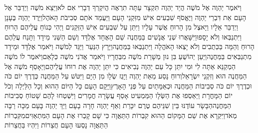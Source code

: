\documentclass[../main/main.tex]{subfiles}
\begin{document}
\begin{multicols}{\ncols}
וַיֹּאמֶר יַהְוֶה אֶל מֹשֶׁה הֲיַד יַהְוֶה תִּקְצָר עַתָּה תִרְאֶה הֲיִקְרְךָ דְבָרִי אִם לֹא\PreVerseSpace{}וַיֵּצֵא מֹשֶׁה וַיְדַבֵּר אֶל הָעָם אֵת דִּבְרֵי יַהְוֶה וַיֶּאֱסֹף שִׁבְעִים אִישׁ מִזִּקְנֵי הָעָם וַיַּעֲמֵד אֹתָם סְבִיבֹת הָאֹהֶל\PreVerseSpace{}וַיֵּרֶד יַהְוֶה בֶּעָנָן וַיְדַבֵּר אֵלָיו וַיָּאצֶל מִן הָרוּחַ אֲשֶׁר עָלָיו וַיִּתֵּן עַל שִׁבְעִים אִישׁ הַזְּקֵנִים וַיְהִי כְּנוֹחַ עֲלֵיהֶם הָרוּחַ וַיִּתְנַבְּאוּ וְלֹא יָסָפוּ\PreVerseSpace{}וַיִּשָּׁאֲרוּ שְׁנֵי אֲנָשִׁים בַּמַּחֲנֶה שֵׁם הָאֶחָד אֶלְדָּד וְשֵׁם הַשֵּׁנִי מֵידָד וַתָּנַח עֲלֵהֶם הָרוּחַ וְהֵמָּה בַּכְּתֻבִים וְלֹא יָצְאוּ הָאֹהֱלָה וַיִּתְנַבְּאוּ בַּמַּחֲנֶה\PreVerseSpace{}וַיָּרָץ הַנַּעַר וַיַּגֵּד לְמֹשֶׁה וַיֹּאמַר אֶלְדָּד וּמֵידָד מִתְנַבְּאִים בַּמַּחֲנֶה\PreVerseSpace{}וַיַּעַן יְהוֹשֻׁעַ בִּן נוּן מְשָׁרֵת מֹשֶׁה מִבְּחֻרָיו וַיֹּאמַר אֲדֹנִי מֹשֶׁה כְּלָאֵם\PreVerseSpace{}וַיֹּאמֶר לוֹ מֹשֶׁה הַמְקַנֵּא אַתָּה לִי וּמִי יִתֵּן כָּל עַם יַהְוֶה נְבִיאִים כִּי יִתֵּן יַהְוֶה אֶת רוּחוֹ עֲלֵיהֶם\PreVerseSpace{}וַיֵּאָסֵף מֹשֶׁה אֶל הַמַּחֲנֶה הוּא וְזִקְנֵי יִשְׂרָאֵל\PreVerseSpace{}וְרוּחַ נָסַע מֵאֵת יַהְוֶה וַיָּגֶז\SubEnd{} שְׂלָו\SubEnd{} מִן הַיָּם וַיִּטֹּשׁ עַל הַמַּחֲנֶה כְּדֶרֶךְ יוֹם כֹּה וּכְדֶרֶךְ יוֹם כֹּה סְבִיבוֹת הַמַּחֲנֶה וּכְאַמָּתַיִם עַל פְּנֵי הָאָרֶץ\PreVerseSpace{}וַיָּקָם הָעָם כָּל הַיּוֹם הַהוּא וְכָל הַלַּיְלָה וְכֹל יוֹם הַמָּחֳרָת וַיַּאַסְפוּ אֶת הַשְּׂלָו הַמַּמְעִיט אָסַף עֲשָׂרָה חֳמָרִים וַיִּשְׁטְחוּ לָהֶם שָׁטוֹחַ סְבִיבוֹת הַמַּחֲנֶה\PreVerseSpace{}הַבָּשָׂר עוֹדֶנּוּ בֵּין שִׁנֵּיהֶם טֶרֶם יִכָּרֵת וְאַף יַהְוֶה חָרָה בָעָם וַיַּךְ יַהְוֶה בָּעָם מַכָּה רַבָּה מְאֹד\PreVerseSpace{}וַיִּקְרָא אֶת שֵׁם הַמָּקוֹם הַהוּא קִבְרוֹת הַתַּאֲוָה כִּי שָׁם קָבְרוּ אֶת הָעָם הַמִּתְאַוִּים\PreVerseSpace{}מִקִּבְרוֹת הַתַּאֲוָה נָסְעוּ הָעָם חֲצֵרוֹת וַיִּהְיוּ בַּחֲצֵרוֹת\OpenSection{}\par

\end{multicols}
\end{document}
